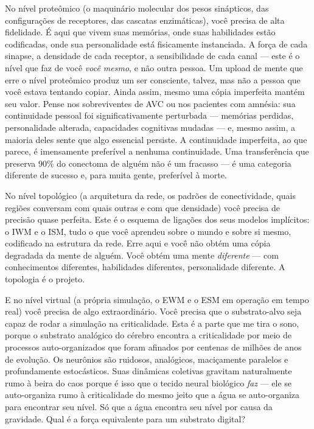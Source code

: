 \documentclass[11pt, twoside, openright]{book}
\begin{document}
No nível proteômico (o maquinário molecular dos pesos sinápticos, das configurações de receptores, das cascatas enzimáticas), você precisa de alta fidelidade. É aqui que vivem suas memórias, onde suas habilidades estão codificadas, onde sua personalidade está fisicamente instanciada. A força de cada sinapse, a densidade de cada receptor, a sensibilidade de cada canal --- este é o nível que faz de você \textit{você mesmo}, e não outra pessoa. Um upload de mente que erre o nível proteômico produz um ser consciente, talvez, mas não a pessoa que você estava tentando copiar. Ainda assim, mesmo uma cópia imperfeita mantém seu valor. Pense nos sobreviventes de AVC ou nos pacientes com amnésia: sua continuidade pessoal foi significativamente perturbada --- memórias perdidas, personalidade alterada, capacidades cognitivas mudadas --- e, mesmo assim, a maioria deles sente que algo essencial persiste. A continuidade imperfeita, ao que parece, é imensamente preferível a nenhuma continuidade. Uma transferência que preserva 90\% do conectoma de alguém não é um fracasso --- é uma categoria diferente de sucesso e, para muita gente, preferível à morte.

No nível topológico (a arquitetura da rede, os padrões de conectividade, quais regiões conversam com quais outras e com que densidade) você precisa de precisão quase perfeita. Este é o esquema de ligações dos seus modelos implícitos: o IWM e o ISM, tudo o que você aprendeu sobre o mundo e sobre si mesmo, codificado na estrutura da rede. Erre aqui e você não obtém uma cópia degradada da mente de alguém. Você obtém uma mente \textit{diferente} --- com conhecimentos diferentes, habilidades diferentes, personalidade diferente. A topologia é o projeto.

E no nível virtual (a própria simulação, o EWM e o ESM em operação em tempo real) você precisa de algo extraordinário. Você precisa que o substrato-alvo seja capaz de rodar a simulação na criticalidade. Esta é a parte que me tira o sono, porque o substrato analógico do cérebro encontra a criticalidade por meio de processos auto-organizados que foram afinados por centenas de milhões de anos de evolução. Os neurônios são ruidosos, analógicos, maciçamente paralelos e profundamente estocásticos. Suas dinâmicas coletivas gravitam naturalmente rumo à beira do caos porque é isso que o tecido neural biológico \textit{faz} --- ele se auto-organiza rumo à criticalidade do mesmo jeito que a água se auto-organiza para encontrar seu nível. Só que a água encontra seu nível por causa da gravidade. Qual é a força equivalente para um substrato digital?
\end{document}

